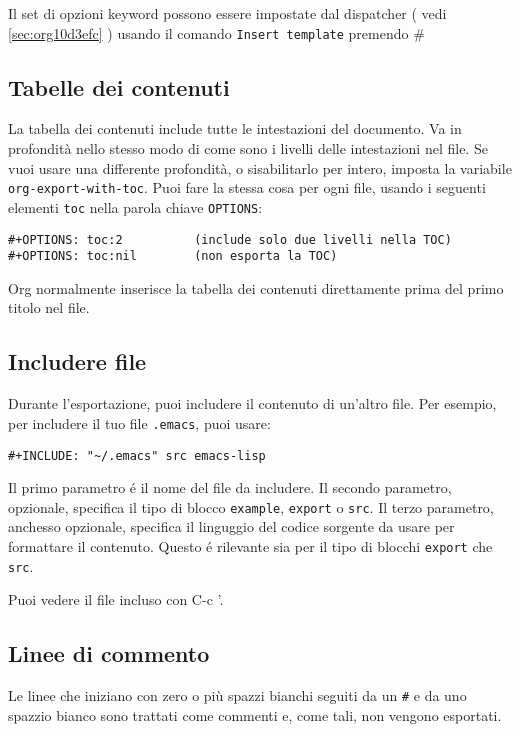 \documentclass[11pt]{article}
\begin{document}
Il set di opzioni keyword possono essere impostate dal dispatcher (
vedi \ref{sec:org10d3efc} ) usando il comando \texttt{Insert
template} premendo \#

\subsection{Tabelle dei contenuti}
\label{sec:org4d93ca5}
La tabella dei contenuti include tutte le intestazioni del
documento. Va in profondità nello stesso modo di come sono i livelli
delle intestazioni nel file. Se vuoi usare una differente profondità,
o sisabilitarlo per intero, imposta la variabile
\texttt{org-export-with-toc}. Puoi fare la stessa cosa per ogni file, usando
i seguenti elementi \texttt{toc} nella parola chiave \texttt{OPTIONS}:

\begin{verbatim}
#+OPTIONS: toc:2          (include solo due livelli nella TOC)
#+OPTIONS: toc:nil        (non esporta la TOC)
\end{verbatim}

Org normalmente inserisce la tabella dei contenuti direttamente prima
del primo titolo nel file.

\subsection{Includere file}
\label{sec:orgec9b04c}
Durante l'esportazione, puoi includere il contenuto di un'altro
file. Per esempio, per includere il tuo file \texttt{.emacs}, puoi usare:

\begin{verbatim}
#+INCLUDE: "~/.emacs" src emacs-lisp
\end{verbatim}


Il primo parametro é il nome del file da includere. Il secondo
parametro, opzionale, specifica il tipo di blocco \texttt{example}, \texttt{export}
o \texttt{src}. Il terzo parametro, anchesso opzionale, specifica il
linguggio del codice sorgente da usare per formattare il
contenuto. Questo é rilevante sia per il tipo di blocchi \texttt{export} che
\texttt{src}.

Puoi vedere il file incluso con C-c '.

\subsection{Linee di commento}
\label{sec:org1e53647}
Le linee che iniziano con zero o più spazzi bianchi seguiti da un \texttt{\#}
e da uno spazzio bianco sono trattati come commenti e, come tali, non
vengono esportati.
\end{document}
